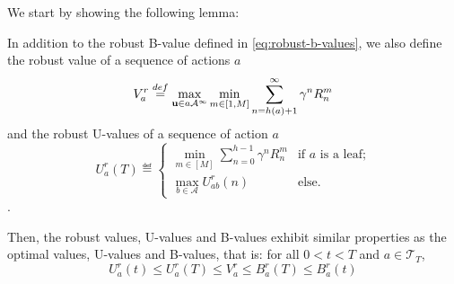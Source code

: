 \documentclass{article}
\begin{document}
We start by showing the following lemma:


\begin{lemma}
	In addition to the robust B-value defined in \eqref{eq:robust-b-values}, we also define the robust value of a sequence of actions $a$
	\begin{equation}
	V_a^r \stackrel{def}{=} \max_{\mathbf{u} \in a\mathcal{A^\infty}} \min_{m\in[1, M]} \sum_{n=h(a)+1}^\infty \gamma^n R^m_n
	\end{equation}
	and the robust U-values of a sequence of action $a$
	\begin{equation}
	U_a^r(T)  \eqdef
	\begin{cases}
	\min_{m\in[M]} \sum_{n=0}^{h-1} \gamma^n R_n^m &\text{if } a \text{ is a leaf;}\\
	\max_{b\in\mathcal{A}} U_{ab}^r(n) & \text{else.}
	\end{cases}
	\end{equation}.
	
	Then, the robust values, U-values and B-values exhibit similar properties as the optimal values, U-values and B-values, that is: for all $0 < t < T$ and $a\in\mathcal{T}_T$,
	\begin{equation}
	U^r_a(t) \leq U^r_a(T) \leq V^r_a \leq B^r_a(T) \leq B^r_a(t)
	\end{equation}
	\label{lemma:uvb}
\end{lemma}
\end{document}

